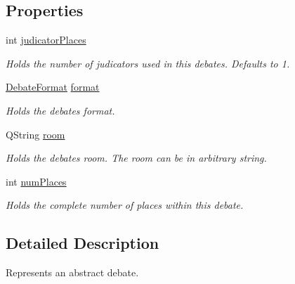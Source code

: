 \subsection*{Properties}
\begin{DoxyCompactItemize}
\item 
\hypertarget{classDebate_a871a42bb78323df624bd51ee733d3f5d}{int \hyperlink{classDebate_a871a42bb78323df624bd51ee733d3f5d}{judicator\-Places}}\label{classDebate_a871a42bb78323df624bd51ee733d3f5d}

\begin{DoxyCompactList}\small\item\em Holds the number of judicators used in this debates. Defaults to 1. \end{DoxyCompactList}\item 
\hypertarget{classDebate_acad1ad74183da0c383be84c62125efc4}{\hyperlink{classDebate_a537fac343de1edd412012e4180b52e04}{Debate\-Format} \hyperlink{classDebate_acad1ad74183da0c383be84c62125efc4}{format}}\label{classDebate_acad1ad74183da0c383be84c62125efc4}

\begin{DoxyCompactList}\small\item\em Holds the debates format. \end{DoxyCompactList}\item 
\hypertarget{classDebate_acab8c12e87212bbc6f14ce180bbdeccb}{Q\-String \hyperlink{classDebate_acab8c12e87212bbc6f14ce180bbdeccb}{room}}\label{classDebate_acab8c12e87212bbc6f14ce180bbdeccb}

\begin{DoxyCompactList}\small\item\em Holds the debates room. The room can be in arbitrary string. \end{DoxyCompactList}\item 
\hypertarget{classDebate_ad61df7c5685157f80dfb46c6efce4bce}{int \hyperlink{classDebate_ad61df7c5685157f80dfb46c6efce4bce}{num\-Places}}\label{classDebate_ad61df7c5685157f80dfb46c6efce4bce}

\begin{DoxyCompactList}\small\item\em Holds the complete number of places within this debate. \end{DoxyCompactList}\end{DoxyCompactItemize}


\subsection{Detailed Description}
Represents an abstract debate. 

